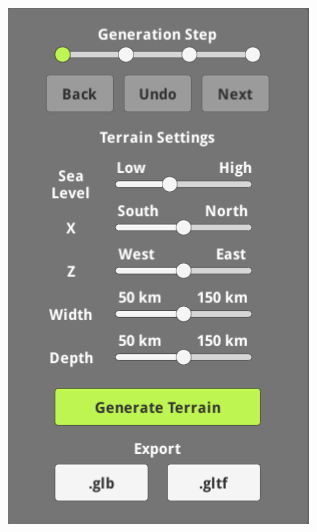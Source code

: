 \begin{figure}[H]
  \centering
  \begin{subfigure}[b]{0.24\textwidth}
    \includegraphics[width=\textwidth]{figure/results/gui1.png}
  \end{subfigure}
  \begin{subfigure}[b]{0.24\textwidth}

\end{subfigure}
\end{figure}
